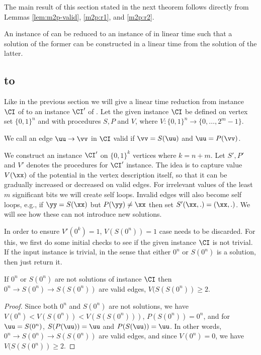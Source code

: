 The main result of this section stated in the next theorem follows directly from Lemmas \ref{lem:m2p-valid}, \ref{m2p:r1}, and \ref{m2p:r2}.

\begin{theorem}\label{thm:m2p}
An instance of \EOML can be reduced to an instance of \EOPL in linear time such that a solution of the former can be constructed in a linear time from the solution of the latter. 
\end{theorem}

\subsection{\EOPL to \EOML}

Like in the previous section we will give a linear time reduction from instance $\CI$ of \EOPL  to an instance $\CI'$ of \EOML. Let the given \EOPL instance $\CI$ be defined on vertex set $\{0,1\}^n$ and with procedures $S,P$ and $V$, where $V:\{0,1\}^n\rightarrow \{0,\dots,2^m-1\}$. 
\medskip

 We call an edge $\uu \rightarrow \vv$ in $\CI$ valid if $\vv=S(\uu)$ and $\uu=P(\vv)$. 
\medskip

We construct an \EOML instance $\CI'$ on $\{0,1\}^k$ vertices where $k=n+m$. 
Let $S',P'$ and $V'$ denotes the procedures for $\CI'$ instance. 
The idea is to capture value $V(\xx)$ of the potential in the vertex description itself, so that it can be gradually increased or decreased on valid edges. For irrelevant values of the least $m$ significant bits we will create self loops. Invalid edges will also become self loops, e.g., if $\yy=S(\xx)$ but $P(\yy)\neq \xx$ then set $S'(\xx,.)=(\xx,.)$. We will see how these can not introduce new solutions. 

%
In order to ensure $V'(0^k)=1$, $V(S(0^n))=1$ case needs to be discarded. For
this, we first do some initial checks to see if the given instance $\CI$ is not
trivial.  If the input \EOPL instance is trivial, in the sense that either
$0^n$ or $S(0^n)$ is a solution, then just return it.

\begin{lemma}
If $0^n$ or $S(0^n)$ are not solutions of \EOPL instance $\CI$ then $0^n \rightarrow S(0^n) \rightarrow S(S(0^n))$ are valid edges, $V(S(S(0^n))\ge 2$. 
\end{lemma}
\begin{proof}
Since both $0^n$ and $S(0^n)$ are not solutions, we have $V(0^n)<V(S(0^n))<V(S(S(0^n)))$, $P(S(0^n))=0^n$, and for $\uu = S(0^n)$, $S(P(\uu))=\uu$ and $P(S(\uu))=\uu$. In other words, $0^n \rightarrow S(0^n) \rightarrow S(S(0^n))$ are valid edges, and since $V(0^n)=0$, we have $V(S(S(0^n))\ge 2$. 
\end{proof}

